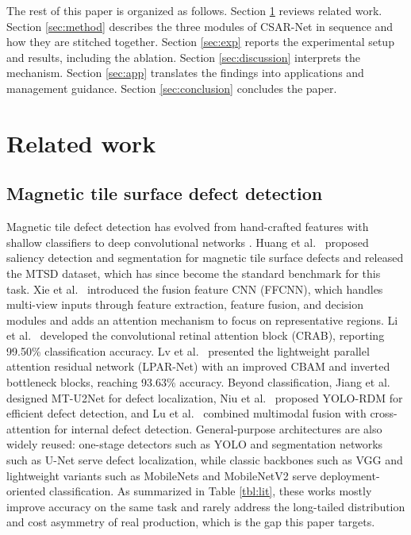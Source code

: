 \documentclass[a4paper,fleqn]{cas-sc}
\begin{document}
\begin{sloppypar}
	\par{
		The rest of this paper is organized as follows. Section \ref{sec:related} reviews related work. Section \ref{sec:method} describes the three modules of CSAR-Net in sequence and how they are stitched together. Section \ref{sec:exp} reports the experimental setup and results, including the ablation. Section \ref{sec:discussion} interprets the mechanism. Section \ref{sec:app} translates the findings into applications and management guidance. Section \ref{sec:conclusion} concludes the paper.
	}

	\section{Related work}
	\label{sec:related}

	\subsection{Magnetic tile surface defect detection}
	\par{
		Magnetic tile defect detection has evolved from hand-crafted features with shallow classifiers to deep convolutional networks \citep{chen2021surface}. Huang et al.\ \citep{huang2020surface} proposed saliency detection and segmentation for magnetic tile surface defects and released the MTSD dataset, which has since become the standard benchmark for this task. Xie et al.\ \citep{xie2021ffcnn} introduced the fusion feature CNN (FFCNN), which handles multi-view inputs through feature extraction, feature fusion, and decision modules and adds an attention mechanism to focus on representative regions. Li et al.\ \citep{li2024attention} developed the convolutional retinal attention block (CRAB), reporting 99.50\% classification accuracy. Lv et al.\ \citep{lv2024lightweight} presented the lightweight parallel attention residual network (LPAR-Net) with an improved CBAM and inverted bottleneck blocks, reaching 93.63\% accuracy. Beyond classification, Jiang et al.\ \citep{jiang2024mtu2net} designed MT-U2Net for defect localization, Niu et al.\ \citep{niu2025yolordm} proposed YOLO-RDM for efficient defect detection, and Lu et al.\ \citep{lu2022multimodal} combined multimodal fusion with cross-attention for internal defect detection. General-purpose architectures are also widely reused: one-stage detectors such as YOLO \citep{redmon2016you} and segmentation networks such as U-Net \citep{ronneberger2015u} serve defect localization, while classic backbones such as VGG \citep{simonyan2015very} and lightweight variants such as MobileNets \citep{howard2017mobilenets} and MobileNetV2 \citep{sandler2018mobilenetv2} serve deployment-oriented classification. As summarized in Table \ref{tbl:lit}, these works mostly improve accuracy on the same task and rarely address the long-tailed distribution and cost asymmetry of real production, which is the gap this paper targets.
	}


\end{sloppypar}
\end{document}
